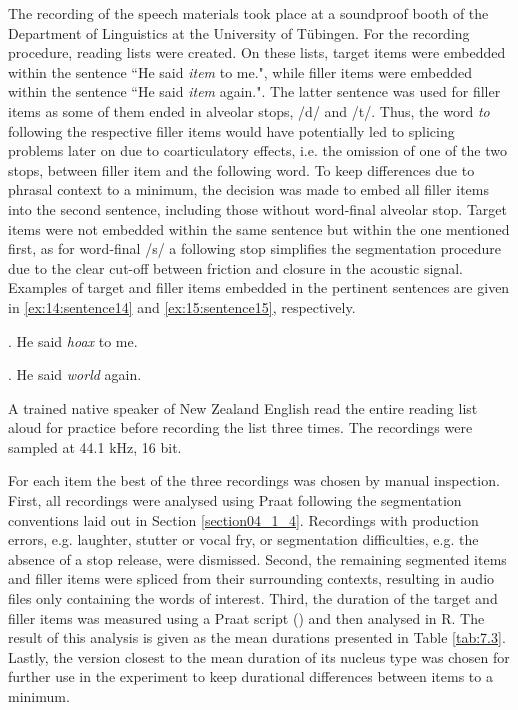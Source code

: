 The recording of the speech materials took place at a soundproof booth of the Department of Linguistics at the University of Tübingen. For the recording procedure, reading lists were created. On these lists, target items were embedded within the sentence ``He said \textit{item} to me.", while filler items were embedded within the sentence ``He said \textit{item} again.". The latter sentence was used for filler items as some of them ended in alveolar stops, /d/ and /t/. Thus, the word \textit{to} following the respective filler items would have potentially led to splicing problems later on due to coarticulatory effects, i.e. the omission of one of the two stops, between filler item and the following word. To keep differences due to phrasal context to a minimum, the decision was made to embed all filler items into the second sentence, including those without word-final alveolar stop. Target items were not embedded within the same sentence but within the one mentioned first, as for word-final /s/ a following stop simplifies the segmentation procedure due to the clear cut-off between friction and closure in the acoustic signal. Examples of target and filler items embedded in the pertinent sentences are given in \ref{ex:14:sentence14} and \ref{ex:15:sentence15}, respectively.

\ex.
\label{ex:14:sentence14}
He said \textit{hoax} to me.

\ex.
\label{ex:15:sentence15}
He said \textit{world} again.

A trained native speaker of New Zealand English read the entire reading list aloud for practice before recording the list three times. The recordings were sampled at 44.1 kHz, 16 bit. 

For each item the best of the three recordings was chosen by manual inspection. First, all recordings were analysed using Praat following the segmentation conventions laid out in Section \ref{section04_1_4}. Recordings with production errors, e.g. laughter, stutter or vocal fry, or segmentation difficulties, e.g. the absence of a stop release, were dismissed. Second, the remaining segmented items and filler items were spliced from their surrounding contexts, resulting in audio files only containing the words of interest. Third, the duration of the target and filler items was measured using a Praat script (\cite{deJong2008}) and then analysed in R. The result of this analysis is given as the mean durations presented in Table \ref{tab:7.3}. Lastly, the version closest to the mean duration of its nucleus type was chosen for further use in the experiment to keep durational differences between items to a minimum.


